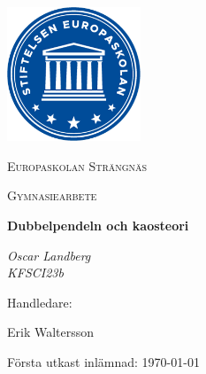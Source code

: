 \documentclass[a4paper, 12pt]{report}
\begin{document}
\begin{titlepage}
	\centering
	\includegraphics[width=0.3\textwidth]{europaskolan.png}\par\vspace{1cm}
	{\LARGE \textsc{Europaskolan Strängnäs}\par}
	\vspace{1cm}
	{\Large \textsc{Gymnasiearbete}\par}
	\vspace{1.5cm}
	{\huge\bfseries Dubbelpendeln och kaosteori \par}
	\vspace{2cm}
	{\Large\itshape Oscar Landberg \\
		KFSCI23b\par}
	\vfill
	Handledare:\par
    \vspace{-1.5mm}
	Erik Waltersson

	\vfill

	{\large Första utkast inlämnad: \today}
\end{titlepage}


\tableofcontents

\end{document}
